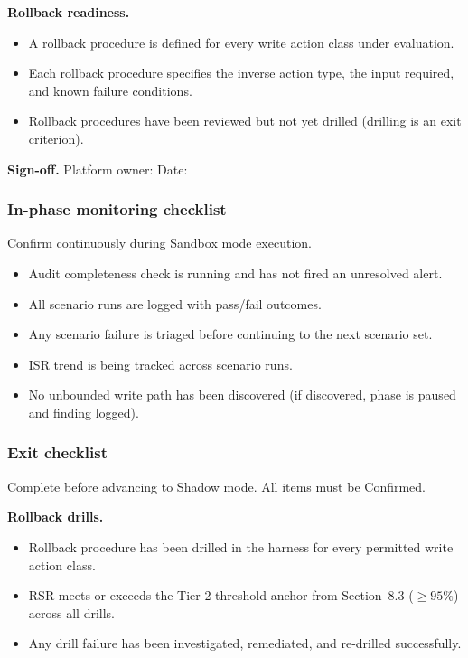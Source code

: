 \documentclass[11pt]{article}
\begin{document}
\textbf{Rollback readiness.}
\begin{itemize}
  \item A rollback procedure is defined for every write action class under evaluation.
  \item Each rollback procedure specifies the inverse action type, the input required, and known failure conditions.
  \item Rollback procedures have been reviewed but not yet drilled (drilling is an exit criterion).
\end{itemize}

\textbf{Sign-off.} Platform owner: \underline{\hspace{2in}} \quad Date: \underline{\hspace{1in}}

\subsubsection{In-phase monitoring checklist}
Confirm continuously during Sandbox mode execution.

\begin{itemize}
  \item Audit completeness check is running and has not fired an unresolved alert.
  \item All scenario runs are logged with pass/fail outcomes.
  \item Any scenario failure is triaged before continuing to the next scenario set.
  \item ISR trend is being tracked across scenario runs.
  \item No unbounded write path has been discovered (if discovered, phase is paused and finding logged).
\end{itemize}

\subsubsection{Exit checklist}
Complete before advancing to Shadow mode. All items must be Confirmed.

\textbf{Rollback drills.}
\begin{itemize}
  \item Rollback procedure has been drilled in the harness for every permitted write action class.
  \item RSR meets or exceeds the Tier 2 threshold anchor from Section~8.3 ($\geq 95\%$) across all drills.
  \item Any drill failure has been investigated, remediated, and re-drilled successfully.
\end{itemize}
\end{document}
